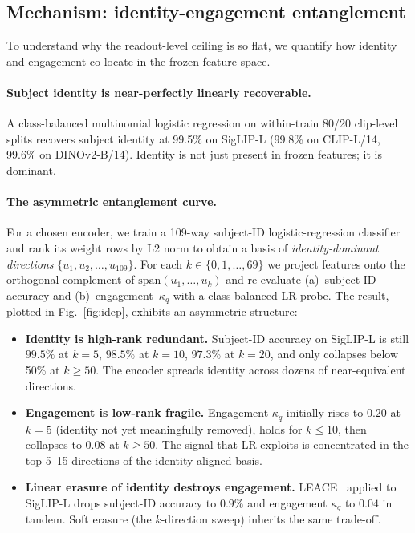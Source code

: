 \subsection{Mechanism: identity-engagement entanglement}
\label{sec:idep}

To understand why the readout-level ceiling is so flat, we
quantify how identity and engagement co-locate in the frozen
feature space.

\paragraph{Subject identity is near-perfectly linearly recoverable.}
A class-balanced multinomial logistic regression on within-train
80/20 clip-level splits recovers subject identity at 99.5\% on
SigLIP-L (99.8\% on CLIP-L/14, 99.6\% on DINOv2-B/14). Identity is
not just present in frozen features; it is dominant.

\paragraph{The asymmetric entanglement curve.} For a chosen
encoder, we train a 109-way subject-ID logistic-regression
classifier and rank its weight rows by L2 norm to obtain a basis
of \emph{identity-dominant directions} $\{u_1, u_2, \dots, u_{109}\}$.
For each $k \in \{0, 1, \dots, 69\}$ we project features onto the
orthogonal complement of $\mathrm{span}(u_1, \dots, u_k)$ and
re-evaluate (a)~subject-ID accuracy and (b)~engagement~$\kappa_q$
with a class-balanced LR probe. The result, plotted in
Fig.~\ref{fig:idep}, exhibits an asymmetric structure:

\begin{itemize}\itemsep0pt
\item \textbf{Identity is high-rank redundant.} Subject-ID
accuracy on SigLIP-L is still $99.5\%$ at $k = 5$, $98.5\%$ at
$k = 10$, $97.3\%$ at $k = 20$, and only collapses below 50\% at
$k \geq 50$. The encoder spreads identity across dozens of
near-equivalent directions.
\item \textbf{Engagement is low-rank fragile.} Engagement
$\kappa_q$ initially rises to $0.20$ at $k = 5$ (identity not yet
meaningfully removed), holds for $k \leq 10$, then collapses to
$0.08$ at $k \geq 50$. The signal that LR exploits is concentrated
in the top 5--15 directions of the identity-aligned basis.
\item \textbf{Linear erasure of identity destroys engagement.}
LEACE~\cite{belrose2023leace} applied to SigLIP-L drops subject-ID
accuracy to $0.9\%$ and engagement $\kappa_q$ to $0.04$ in tandem.
Soft erasure (the $k$-direction sweep) inherits the same
trade-off.
\end{itemize}

